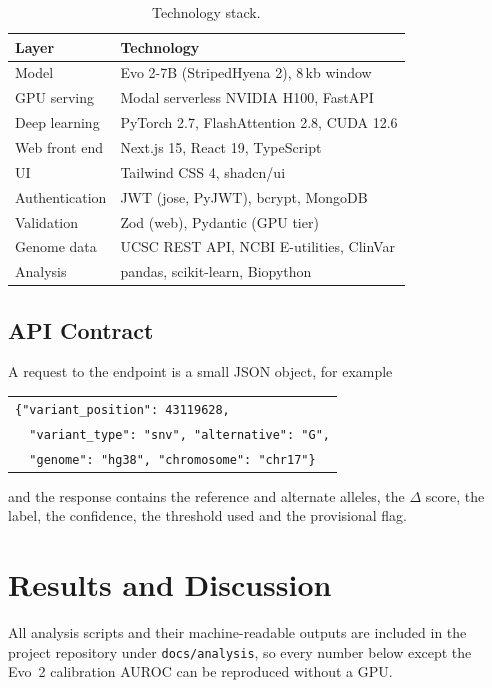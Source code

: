 \documentclass[conference,a4paper]{IEEEtran}
\begin{document}
\begin{table}[!t]
\caption{Technology stack.}
\label{tab:stack}
\centering
\footnotesize
\begin{tabular}{@{}ll@{}}
\toprule
Layer & Technology \\
\midrule
Model & Evo 2-7B (StripedHyena 2), 8\,kb window \\
GPU serving & Modal serverless NVIDIA H100, FastAPI \\
Deep learning & PyTorch 2.7, FlashAttention 2.8, CUDA 12.6 \\
Web front end & Next.js 15, React 19, TypeScript \\
UI & Tailwind CSS 4, shadcn/ui \\
Authentication & JWT (jose, PyJWT), bcrypt, MongoDB \\
Validation & Zod (web), Pydantic (GPU tier) \\
Genome data & UCSC REST API, NCBI E-utilities, ClinVar \\
Analysis & pandas, scikit-learn, Biopython \\
\bottomrule
\end{tabular}
\end{table}

\subsection{API Contract}
A request to the endpoint is a small JSON object, for example
\begin{center}
\footnotesize
\begin{tabular}{@{}l@{}}
\texttt{\{"variant\_position": 43119628,}\\
\texttt{\ \ "variant\_type": "snv", "alternative": "G",}\\
\texttt{\ \ "genome": "hg38", "chromosome": "chr17"\}}
\end{tabular}
\end{center}
and the response contains the reference and alternate alleles, the $\Delta$ score, the label, the confidence, the threshold used and the provisional flag.

\section{Results and Discussion}
\label{sec:results}

All analysis scripts and their machine-readable outputs are included in the project repository under \texttt{docs/analysis}, so every number below except the Evo~2 calibration AUROC can be reproduced without a GPU.
\end{document}
